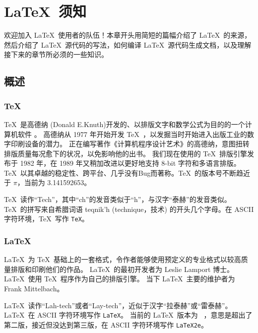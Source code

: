 \chapter{\LaTeX\ 须知}\label{chap:basics}

\begin{intro}
欢迎加入 \LaTeX\ 使用者的队伍！本章开头用简短的篇幅介绍了 \LaTeX\ 的来源，
然后介绍了 \LaTeX\ 源代码的写法，如何编译 \LaTeX\ 源代码生成文档，以及理解接下来的章节所必须的一些知识。
\end{intro}

\section{概述}\label{sec:intro}

\subsection{\protect\TeX}\label{subsec:tex}

\TeX\ 是高德纳 (Donald E.Knuth)开发的、以排版文字和数学公式为目的的一个计算机软件 \cite{texbook}。
高德纳从 1977 年开始开发 \TeX\ ，以发掘当时开始进入出版工业的数字印刷设备的潜力。
正在编写著作《计算机程序设计艺术》的高德纳，意图扭转排版质量每况愈下的状况，以免影响他的出书。
我们现在使用的 \TeX\ 排版引擎发布于 1982 年，在 1989 年又稍加改进以更好地支持 8-bit 字符和多语言排版。
\TeX\ 以其卓越的稳定性、跨平台、几乎没有Bug而著称。\TeX\ 的版本号不断趋近于 $\pi$，当前为 3.141592653。

\TeX\ 读作``Tech''，其中``ch''的发音类似于``h''，与汉字“泰赫”的发音类似。\TeX\ 的拼写来自希腊词语
{\selectfont teqnik'h} (technique，技术) 的开头几个字母。在 ASCII 字符环境，\TeX\ 写作 \texttt{TeX}。

\subsection{\LaTeX}\label{subsec:latex}

\LaTeX\ 为 \TeX\ 基础上的一套格式，令作者能够使用预定义的专业格式以较高质量排版和印刷他们的作品。
\LaTeX\ 的最初开发者为 Leslie Lamport 博士\cite{manual}。\LaTeX\ 使用 \TeX\ 程序作为自己的排版引擎。
当下 \LaTeX\ 主要的维护者为 Frank Mittelbach。

\LaTeX\ 读作``Lah-tech''或者``Lay-tech''，近似于汉字“拉泰赫”或“雷泰赫”。\LaTeX\ 在 ASCII 字符环境写作 \texttt{LaTeX}。
当前的 \LaTeX\ 版本为 \LaTeXe\ ，意思是超出了第二版，接近但没达到第三版，在 ASCII 字符环境写作 \texttt{LaTeX2e}。

